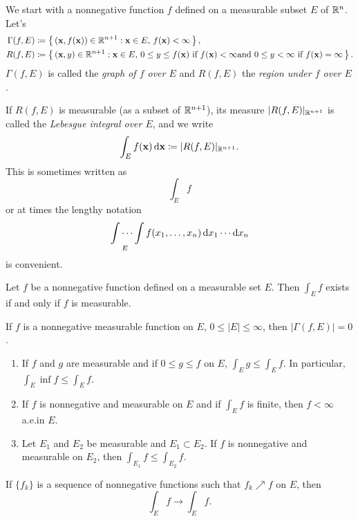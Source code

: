 We start with a nonnegative function $f$ defined on a measurable subset $E$
of $\mathbb{R}^n$. Let's
\begin{equation}
\label{eq:graph-and-region}
\begin{aligned}
\Gamma(f,E)&\coloneqq\left\{\,(\mathbf{x},f(\mathbf{x}))\in\mathbb{R}^{n+1}:\text{$\mathbf{x}\in
    E$, $f(\mathbf{x})<\infty$}\,\right\},\\
R(f,E)&\coloneqq\left\{\,(\mathbf{x},y)\in\mathbb{R}^{n+1}:\text{$\mathbf{x}\in E$, $0\leq
    y\leq f(\mathbf{x})$ if $f(\mathbf{x})<\infty$and $0\leq y<\infty$ if
    $f(\mathbf{x})=\infty$}\,\right\}.
\end{aligned}
\end{equation}
$\Gamma(f,E)$ is called the \emph{graph of $f$ over $E$} and $R(f,E)$ the
\emph{region under $f$ over $E$}.

If $R(f,E)$ is measurable (as a subset of $\mathbb{R}^{n+1}$), its measure
$|R(f,E)|_{\mathbb{R}^{n+1}}$ is called the \emph{Lebesgue integral over $E$},
and we write
\begin{equation}
\label{eq:lebesgue-integral}
\int_E f(\mathbf{x})\mathop{}\!\mathrm{d}\mathbf{x}\coloneqq|R(f,E)|_{\mathbb{R}^{n+1}}.
\end{equation}
This is sometimes written as
\[
\int_E f
\]
or at times the lengthy notation
\[
\idotsint\limits_{E} f(x_1,\dotsc,x_n)\mathop{}\!\mathrm{d} x_1\cdots\mathop{}\!\mathrm{d} x_n
\]
is convenient.
\begin{theorem*}[5.1]
Let $f$ be a nonnegative function defined on a measurable set $E$. Then
$\int_E f$ exists if and only if $f$ is measurable.
\end{theorem*}
\begin{lemma*}[5.3]
If $f$ is a nonnegative measurable function on $E$, $0\leq |E|\leq\infty$,
then $|\Gamma(f,E)|=0$.
\end{lemma*}
\begin{theorem*}[5.5]
\begin{enumerate}[label=\textnormal{(\roman*)}]
\item If $f$ and $g$ are measurable and if $0\leq g\leq f$ on $E$, $\int_E
  g\leq\int_E f$. In particular, $\int_E\inf f\leq\int_E f$.
\item If $f$ is nonnegative and measurable on $E$ and if $\int_E f$ is
  finite, then $f<\infty$ a.e.\@ in $E$.
\item Let $E_1$ and $E_2$ be measurable and $E_1\subset E_2$. If $f$ is
  nonnegative and measurable on $E_2$, then $\int_{E_1} f\leq\int_{E_2}f$.
\end{enumerate}
\end{theorem*}
\begin{theorem*}
If $\{f_k\}$ is a sequence of nonnegative functions such that $f_k\nearrow
f$ on $E$, then
\[
\int_E f\to\int_E f.
\]
\end{theorem*}
